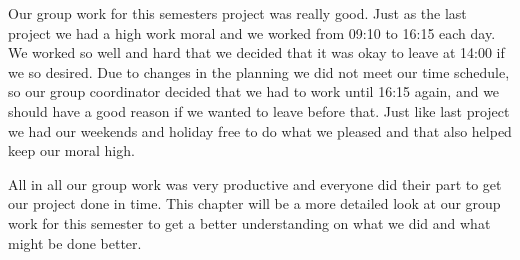 Our group work for this semesters project was really good. Just as the last project we had a high work moral and we worked from 09:10 to 16:15 each day. We worked so well and hard that we decided that it was okay to leave at 14:00 if we so desired. Due to changes in the planning we did not meet our time schedule, so our group coordinator decided that we had to work until 16:15 again, and we should have a good reason if we wanted to leave before that. 
Just like last project we had our weekends and holiday free to do what we pleased and that also helped keep our moral high.

All in all our group work was very productive and everyone did their part to get our project done in time. 
This chapter will be a more detailed look at our group work for this semester to get a better understanding on what we did and what might be done better.